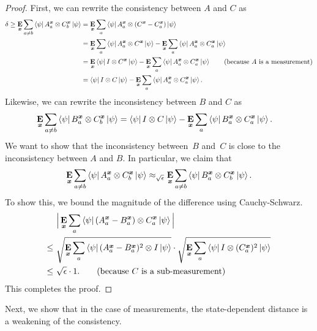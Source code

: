 \begin{proof}
  First, we can
  rewrite the consistency between $A$ and $C$ as
  \begin{align*}
    \delta \geq \mathop{\bf E\/}_{{\boldsymbol{x}}} \sum_{a \neq b} \bra{\psi} A^{{\boldsymbol{x}}}_a \otimes C^{{\boldsymbol{x}}}_b
    \ket{\psi} 
    & = \mathop{\bf E\/}_{{\boldsymbol{x}}} \sum_{a} \bra{\psi} A^{{\boldsymbol{x}}}_a \otimes (C^{{\boldsymbol{x}}} - C^{{\boldsymbol{x}}}_a) \ket{\psi} \\
    & =  \mathop{\bf E\/}_{{\boldsymbol{x}}} \sum_{a} \bra{\psi} A^{{\boldsymbol{x}}}_a \otimes C^{{\boldsymbol{x}}} \ket{\psi}
    			- \mathop{\bf E\/}_{{\boldsymbol{x}}} \sum_{a} \bra{\psi} A^{{\boldsymbol{x}}}_a \otimes C^{{\boldsymbol{x}}}_a \ket{\psi} \\
    & =  \mathop{\bf E\/}_{{\boldsymbol{x}}} \bra{\psi} I \otimes C^{{\boldsymbol{x}}} \ket{\psi}
    			- \mathop{\bf E\/}_{{\boldsymbol{x}}} \sum_{a} \bra{\psi} A^{{\boldsymbol{x}}}_a \otimes C^{{\boldsymbol{x}}}_a \ket{\psi} \tag{because~$A$ is a measurement}\\
    & = \bra{\psi} I \otimes C \ket{\psi} - \mathop{\bf E\/}_{{\boldsymbol{x}}} \sum_a
                 \bra{\psi} A^{{\boldsymbol{x}}}_a \otimes C^{{\boldsymbol{x}}}_a \ket{\psi}.
  \end{align*}
  Likewise, we can rewrite the
  inconsistency between $B$ and $C$ as
  \begin{align*}
    \mathop{\bf E\/}_{{\boldsymbol{x}}} \sum_{a \neq b} \bra{\psi} B^{{\boldsymbol{x}}}_a \otimes C^{{\boldsymbol{x}}}_b
    \ket{\psi} &= \bra{\psi} I \otimes C \ket{\psi} - \mathop{\bf E\/}_{{\boldsymbol{x}}} \sum_a
                 \bra{\psi} B^{{\boldsymbol{x}}}_a \otimes C^{{\boldsymbol{x}}}_a \ket{\psi}.
  \end{align*}
  We want to show that the inconsistency between~$B$ and~$C$ is close to the inconsistency between $A$
  and $B$. In particular, we claim that
  \begin{equation*}
  \mathop{\bf E\/}_{{\boldsymbol{x}}} \sum_{a \neq b} \bra{\psi} A^{{\boldsymbol{x}}}_a \otimes C^{{\boldsymbol{x}}}_b
    \ket{\psi}
    \approx_{\sqrt{\epsilon}} \mathop{\bf E\/}_{{\boldsymbol{x}}} \sum_{a \neq b} \bra{\psi} B^{{\boldsymbol{x}}}_a \otimes C^{{\boldsymbol{x}}}_b
    \ket{\psi}.
  \end{equation*}
  To show this, we bound the magnitude of the difference using Cauchy-Schwarz.
  \begin{align*}
   & \Big| \mathop{\bf E\/}_{{\boldsymbol{x}}} \sum_{a } \bra{\psi} (A^{{\boldsymbol{x}}}_a - B^{{\boldsymbol{x}}}_a) \otimes
                     C^{{\boldsymbol{x}}}_a\ket{\psi} \Big| \nonumber
    \\
    \leq~& \sqrt{ \mathop{\bf E\/}_{{\boldsymbol{x}}} \sum_{a} \bra{\psi}
                            (A^{{\boldsymbol{x}}}_a - B^{{\boldsymbol{x}}}_a)^2 \otimes I \ket{\psi}}
                            \cdot \sqrt{\mathop{\bf E\/}_{{\boldsymbol{x}}} \sum_{a} \bra{\psi} I \otimes (C^{{\boldsymbol{x}}}_a)^2 \ket{\psi}} \\
    \leq~& \sqrt{\epsilon} \cdot 1. \tag{because~$C$ is a sub-measurement}
  \end{align*}
  This completes the proof.
\end{proof}


Next, we show that in the case of measurements,
the state-dependent distance is a weakening of the consistency.

